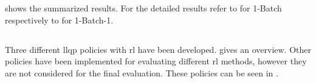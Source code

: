 \documentclass{seal_thesis}
\begin{document}
 shows the summarized results. For the detailed results refer to  for 1-Batch respectively to  for 1-Batch-1.

\begin{table}[!ht]
\centering
{}
\caption{Reduction (in \%) across all \glspl{kpi} of the batch policies with \gls{rl} against the \gls{msa} solver}
\label{tab:rl_batch_kpis_comp_gain}
\end{table}

\subsection{}
\label{subsec:rl_llqp}

Three different \gls{llqp} policies with \gls{rl} have been developed.  gives an overview. Other policies have been implemented for evaluating different \gls{rl} methods, however they are not considered for the final evaluation. These policies can be seen in .
\end{document}
